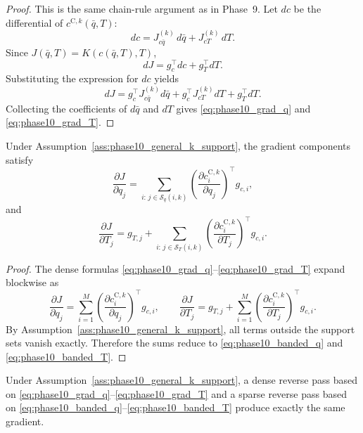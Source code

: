 \begin{proof}
This is the same chain-rule argument as in Phase~9.
Let \(dc\) be the differential of \(c^{\mathrm{C},k}(\bar q,T)\):
\[
dc
=
J_{c\bar q}^{(k)}\,d\bar q + J_{cT}^{(k)}\,dT.
\]
Since \(J(\bar q,T)=K(c(\bar q,T),T)\),
\[
dJ = g_c^\top dc + g_T^\top dT.
\]
Substituting the expression for \(dc\) yields
\[
dJ
=
g_c^\top J_{c\bar q}^{(k)}d\bar q
+
g_c^\top J_{cT}^{(k)}dT
+
g_T^\top dT.
\]
Collecting the coefficients of \(d\bar q\) and \(dT\) gives \eqref{eq:phase10_grad_q} and \eqref{eq:phase10_grad_T}.
\end{proof}

\begin{proposition}
\label{prop:phase10_banded_accum}
Under Assumption~\ref{ass:phase10_general_k_support}, the gradient components satisfy
\begin{equation}
\label{eq:phase10_banded_q}
\frac{\partial J}{\partial q_j}
=
\sum_{i:\, j\in \mathcal S_q(i,k)}
\left(\frac{\partial c_i^{\mathrm{C},k}}{\partial q_j}\right)^\top g_{c,i},
\end{equation}
and
\begin{equation}
\label{eq:phase10_banded_T}
\frac{\partial J}{\partial T_j}
=
g_{T,j}
+
\sum_{i:\, j\in \mathcal S_T(i,k)}
\left(\frac{\partial c_i^{\mathrm{C},k}}{\partial T_j}\right)^\top g_{c,i}.
\end{equation}
\end{proposition}

\begin{proof}
The dense formulas \eqref{eq:phase10_grad_q}--\eqref{eq:phase10_grad_T} expand blockwise as
\[
\frac{\partial J}{\partial q_j}
=
\sum_{i=1}^{M}
\left(\frac{\partial c_i^{\mathrm{C},k}}{\partial q_j}\right)^\top g_{c,i},
\qquad
\frac{\partial J}{\partial T_j}
=
g_{T,j}
+
\sum_{i=1}^{M}
\left(\frac{\partial c_i^{\mathrm{C},k}}{\partial T_j}\right)^\top g_{c,i}.
\]
By Assumption~\ref{ass:phase10_general_k_support}, all terms outside the support sets vanish exactly.
Therefore the sums reduce to \eqref{eq:phase10_banded_q} and \eqref{eq:phase10_banded_T}.
\end{proof}

\begin{corollary}
\label{cor:phase10_dense_sparse_identical}
Under Assumption~\ref{ass:phase10_general_k_support}, a dense reverse pass based on \eqref{eq:phase10_grad_q}--\eqref{eq:phase10_grad_T} and a sparse reverse pass based on \eqref{eq:phase10_banded_q}--\eqref{eq:phase10_banded_T} produce exactly the same gradient.
\end{corollary}

